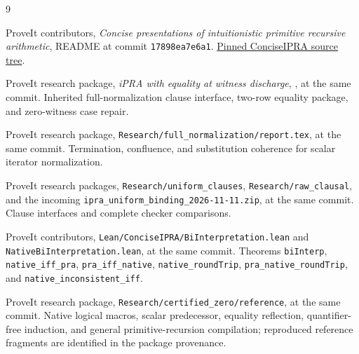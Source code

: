 \documentclass[11pt,a4paper]{article}
\theoremstyle{definition}\newtheorem{definition}[theorem]{Definition}
\theoremstyle{remark}\newtheorem{remark}[theorem]{Remark}
\begin{document}
\begin{thebibliography}{9}
\raggedright
{}
ProveIt contributors, \emph{Concise presentations of intuitionistic
primitive recursive arithmetic}, README at commit
\texttt{17898ea7e6a1}.
\href{https://github.com/VladimirReshetnikov/ProveIt/tree/17898ea7e6a1300dfdcad71040d5daeed67916d4/Logic/PrimitiveRecursiveArithmetic/ConciseIPRA}{Pinned ConciseIPRA source tree}.

ProveIt research package, \emph{iPRA with equality at witness discharge},
,
at the same commit. Inherited full-normalization clause interface,
two-row equality package, and zero-witness case repair.

ProveIt research package, \texttt{Research/full\_normalization/report.tex},
at the same commit. Termination, confluence, and substitution coherence
for scalar iterator normalization.

ProveIt research packages, \texttt{Research/uniform\_clauses},
\texttt{Research/raw\_clausal}, and the incoming
\texttt{ipra\_uniform\_binding\_2026-11-11.zip}, at the same commit.
Clause interfaces and complete checker comparisons.

ProveIt contributors, \texttt{Lean/ConciseIPRA/BiInterpretation.lean}
and \texttt{NativeBiInterpretation.lean}, at the same commit.
Theorems \texttt{biInterp}, \texttt{native\_iff\_pra},
\texttt{pra\_iff\_native}, \texttt{native\_roundTrip},
\texttt{pra\_native\_roundTrip}, and
\texttt{native\_inconsistent\_iff}.

ProveIt research package, \texttt{Research/certified\_zero/reference},
at the same commit. Native logical macros, scalar predecessor,
equality reflection, quantifier-free induction, and general
primitive-recursion compilation; reproduced reference fragments
are identified in the package provenance.
\end{thebibliography}
\end{document}
